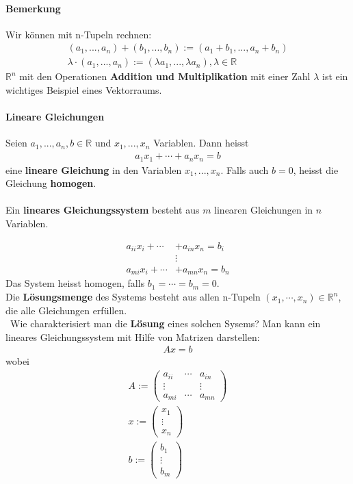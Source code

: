 \documentclass[11pt]{report}
\newcommand*\Zb[1] {\mathbb{#1}}
\newcommand*\f[1] {\textbf{#1}}
\begin{document}
\paragraph{Bemerkung} Wir können mit n-Tupeln rechnen:
\begin{align}
(a_1, ..., a_n) + (b_1, ..., b_n) := (a_1 + b_1, ..., a_n + b_n)\\
\lambda \cdot (a_1, ..., a_n) := (\lambda a_1, ..., \lambda a_n), \lambda \in \Zb{R}
\end{align}
$\Zb{R}^{n}$ mit den Operationen \textbf{Addition und Multiplikation} mit einer Zahl $\lambda$ ist ein wichtiges
Beispiel eines Vektorraums.

\paragraph{Lineare Gleichungen} Seien $a_1, ..., a_n, b \in \Zb{R}$ und $x_1, ..., x_n$ Variablen. Dann heisst
\begin{align}
a_1 x_1 + \cdots + a_n x_n = b
\end{align}
eine \textbf{lineare Gleichung} in den Variablen $x_1, ..., x_n$.
Falls auch $b=0$, heisst die Gleichung \textbf{homogen}.\\\\
Ein \textbf{lineares Gleichungssystem} besteht aus $m$ linearen Gleichungen in $n$ Variablen.

\begin{align}
a_{ii} x_{i} + \cdots &+ a_{in} x_n = b_i \\
                      &\vdots \\
a_{mi} x_{i} + \cdots &+ a_{mn} x_n = b_n
\end{align}
Das System heisst homogen, falls $b_1 = \cdots = b_m = 0$.\\
Die \textbf{Lösungsmenge} des Systems besteht aus allen n-Tupeln
$(x_1, \cdots, x_n) \in \Zb{R}^{n}$\textrm{, die alle Gleichungen erfüllen.} \\\
Wie charakterisiert man die \f{Lösung} eines solchen Sysems?
Man kann ein lineares Gleichungssystem mit Hilfe von Matrizen darstellen:
\begin{align}
A x  = b
\end{align}
wobei 
\begin{align}
A := \begin{pmatrix} a_{ii} & \cdots & a_{in} \\ \vdots &  & \vdots \\ a_{mi} & \cdots & a_{mn} \end{pmatrix} \\
x := \begin{pmatrix} x_{1}  \\ \vdots  \\ x_{n} \end{pmatrix} \\
b := \begin{pmatrix} b_{1}  \\ \vdots  \\ b_{m} \end{pmatrix} 
\end{align}
\end{document}
